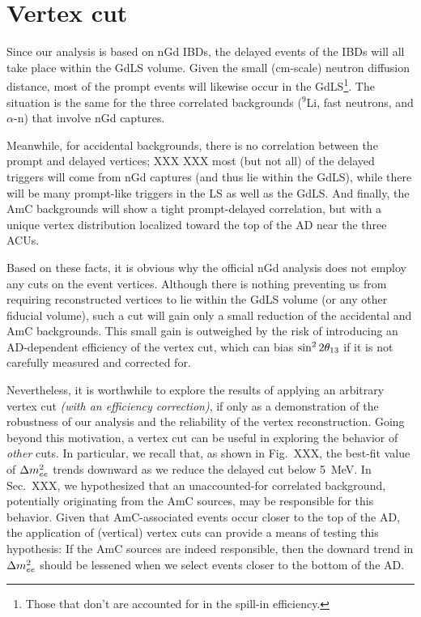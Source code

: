 \documentclass[../thesis.tex]{subfiles}
\begin{document}
\section{Vertex cut}
\label{sec:cutVaryVertexCut}

\begin{comment}
  XXX Do our adjustments of background rates account for the fact that some backgrounds can occur in the GdLS+LS whereas others occur only in GdLS?

Accidentals -- Handled automatically, no adjustment, we're good
Li9, fast-n, alpha-n: Only in GdLS, ???
AmC: Both. R distribution unknown but probably ``lumpy''. Z probably like what we did.
\end{comment}

Since our analysis is based on nGd IBDs, the delayed events of the IBDs will all take place within the GdLS volume. Given the small (cm-scale) neutron diffusion distance, most of the prompt events will likewise occur in the GdLS\footnote{Those that don't are accounted for in the spill-in efficiency.}. The situation is the same for the three correlated backgrounds ($^9$Li, fast neutrons, and $\alpha$-n) that involve nGd captures.

Meanwhile, for accidental backgrounds, there is no correlation between the prompt and delayed vertices; XXX XXX most (but not all) of the delayed triggers will come from nGd captures (and thus lie within the GdLS), while there will be many prompt-like triggers in the LS as well as the GdLS. And finally, the AmC backgrounds will show a tight prompt-delayed correlation, but with a unique vertex distribution localized toward the top of the AD near the three ACUs.

Based on these facts, it is obvious why the official nGd analysis does not employ any cuts on the event vertices. Although there is nothing preventing us from requiring reconstructed vertices to lie within the GdLS volume (or any other fiducial volume), such a cut will gain only a small reduction of the accidental and AmC backgrounds. This small gain is outweighed by the risk of introducing an AD-dependent efficiency of the vertex cut, which can bias $\sin^2 2\theta_{13}$ if it is not carefully measured and corrected for.

Nevertheless, it is worthwhile to explore the results of applying an arbitrary vertex cut \emph{(with an efficiency correction)}, if only as a demonstration of the robustness of our analysis and the reliability of the vertex reconstruction. Going beyond this motivation, a vertex cut can be useful in exploring the behavior of \emph{other} cuts. In particular, we recall that, as shown in Fig.~XXX, the best-fit value of $\Delta m^2_{ee}$ trends downward as we reduce the delayed cut below 5~MeV. In Sec.~XXX, we hypothesized that an unaccounted-for correlated background, potentially originating from the AmC sources, may be responsible for this behavior. Given that AmC-associated events occur closer to the top of the AD, the application of (vertical) vertex cuts can provide a means of testing this hypothesis: If the AmC sources are indeed responsible, then the downard trend in $\Delta m^2_{ee}$ should be lessened when we select events closer to the bottom of the AD\@.
\end{document}
